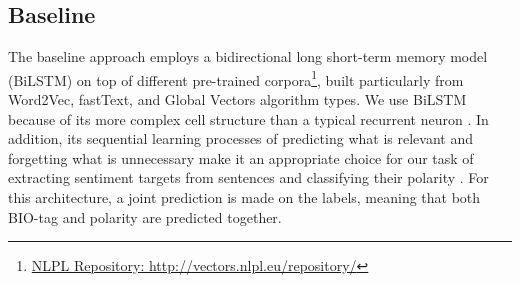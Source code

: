 \documentclass[11pt,a4paper]{article}
\begin{document}
\subsection{Baseline}
\label{baseline}
The baseline approach employs a bidirectional long short-term memory model (BiLSTM) on top of different pre-trained corpora\footnote{\href{http://vectors.nlpl.eu/repository/}{NLPL Repository: http://vectors.nlpl.eu/repository/}}, built particularly from Word2Vec, fastText, and Global Vectors algorithm types. 
We use BiLSTM because of its %
more complex cell structure than a typical recurrent neuron \cite{BiLSTM}. In addition, its sequential learning processes of predicting what is relevant and forgetting what is unnecessary %
make it an appropriate choice for our task of extracting sentiment targets from sentences and classifying their polarity \cite{HuangXY15}. For this architecture, a joint prediction is made on the labels, meaning that both BIO-tag and polarity are predicted together. 

\end{document}
